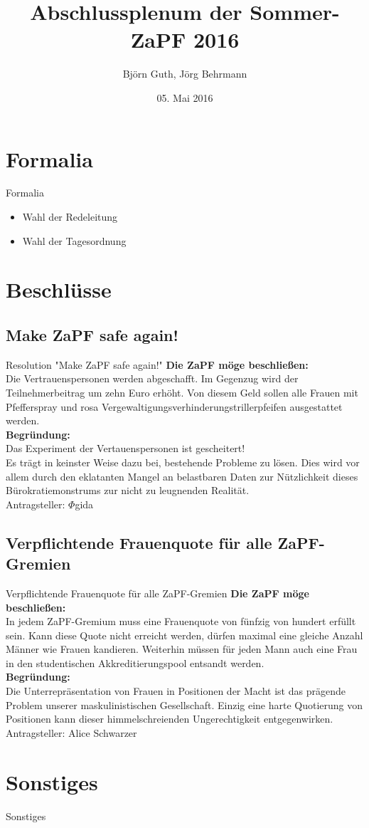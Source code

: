 \documentclass[compress]{beamer}
\title[Abschlussplenum SoSe16]{Abschlussplenum der Sommer-ZaPF 2016}
\author{Björn Guth, Jörg Behrmann}
\institute[Zusammenkunft aller Physikfachschaften]
\date{05. Mai 2016}
\begin{document}
\begin{frame}[plain]{}
  \titlepage
\end{frame}

\section{Formalia}
\begin{frame}{Formalia}
	\begin{itemize}
		\item Wahl der Redeleitung
		\item Wahl der Tagesordnung
	\end{itemize}
\end{frame}

\section{Beschlüsse}
\subsection{Make ZaPF safe again!}
\begin{frame}{Resolution "Make ZaPF safe again!"}
	\textbf{Die ZaPF möge beschließen:}\\
	Die Vertrauenspersonen werden abgeschafft. Im Gegenzug wird der Teilnehmerbeitrag um zehn Euro erhöht. Von diesem Geld sollen alle Frauen mit Pfefferspray und rosa Vergewaltigungsverhinderungstrillerpfeifen ausgestattet werden.\\
	\textbf{Begründung:}\\
	Das Experiment der Vertauenspersonen ist gescheitert!\\
	Es trägt in keinster Weise dazu bei, bestehende Probleme zu lösen. Dies wird vor allem durch den eklatanten Mangel an belastbaren Daten zur Nützlichkeit dieses Bürokratiemonstrums zur nicht zu leugnenden Realität.\\
	\hfill Antragsteller: $\Phi{}$gida
\end{frame}

\subsection{Verpflichtende Frauenquote für alle ZaPF-Gremien}
\begin{frame}{Verpflichtende Frauenquote für alle ZaPF-Gremien}
	\textbf{Die ZaPF möge beschließen:}\\
	In jedem ZaPF-Gremium muss eine Frauenquote von fünfzig von hundert erfüllt sein. Kann diese Quote nicht erreicht werden, dürfen maximal eine gleiche Anzahl Männer wie Frauen kandieren. Weiterhin müssen für jeden Mann auch eine Frau in den studentischen Akkreditierungspool entsandt werden.\\
	\textbf{Begründung:}\\
	Die Unterrepräsentation von Frauen in Positionen der Macht ist das prägende Problem unserer maskulinistischen Gesellschaft. Einzig eine harte Quotierung von Positionen kann dieser himmelschreienden Ungerechtigkeit entgegenwirken.\\
	\hfill Antragsteller: Alice Schwarzer
\end{frame}

\section{Sonstiges}
\begin{frame}{Sonstiges}
\end{frame}
\end{document}
